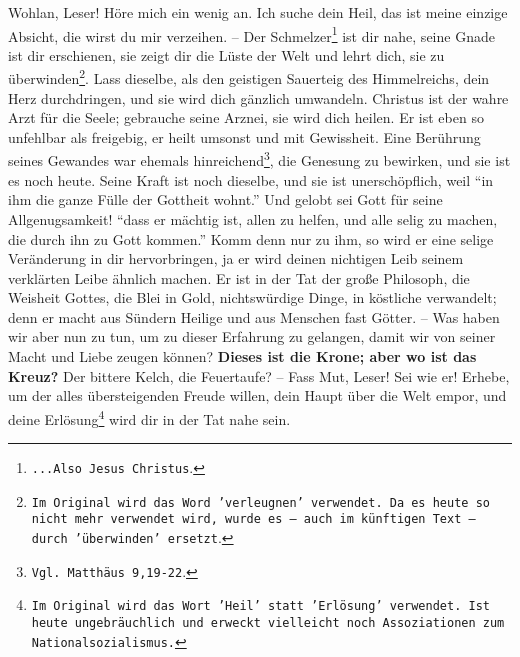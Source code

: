 Wohlan, Leser! Höre mich ein wenig an. Ich suche dein Heil, das ist meine
einzige Absicht, die wirst du mir verzeihen. -- Der
Schmelzer\footnote{\texttt{...Also
Jesus Christus}.} ist dir nahe, seine Gnade ist dir erschienen, sie zeigt dir die
Lüste der Welt und lehrt dich, sie zu überwinden\footnote{\texttt{Im Original
wird das
Word 'verleugnen' verwendet. Da es heute so nicht mehr verwendet wird, wurde
es -- auch im künftigen Text -- durch 'überwinden' ersetzt}.}. Lass dieselbe,
als den geistigen Sauerteig des Himmelreichs, dein Herz durchdringen, und sie
wird dich gänzlich umwandeln. Christus ist der wahre Arzt für die Seele;
gebrauche seine Arznei, sie wird dich heilen. Er ist eben so unfehlbar als
freigebig, er heilt umsonst und mit Gewissheit. Eine Berührung seines Gewandes
war ehemals hinreichend\footnote{\texttt{Vgl. Matthäus 9,19-22}.}, die Genesung
zu
bewirken, und sie ist es noch heute. Seine Kraft ist noch dieselbe, und sie ist
unerschöpflich, weil "`in ihm die ganze Fülle der Gottheit wohnt."' Und gelobt
sei Gott für seine Allgenugsamkeit! "`dass er mächtig ist, allen zu helfen, und
alle selig zu machen, die durch ihn zu Gott kommen."' Komm denn nur zu ihm, so
wird er eine selige Veränderung in dir hervorbringen, ja er wird deinen
nichtigen Leib seinem verklärten Leibe ähnlich machen. Er ist in der Tat der
große Philosoph, die Weisheit Gottes, die Blei in Gold, nichtswürdige Dinge, in
köstliche verwandelt; denn er macht aus Sündern Heilige und aus Menschen fast
Götter. -- Was haben wir aber nun zu tun, um zu dieser Erfahrung zu gelangen,
damit wir von seiner Macht und Liebe zeugen können? 
 \textbf{Dieses ist die
Krone; aber wo ist das Kreuz?} Der bittere Kelch, die Feuertaufe? -- Fass Mut,
Leser! Sei wie er! Erhebe, um der alles übersteigenden Freude willen, dein Haupt
über die Welt empor, und deine Erlösung\footnote{\texttt{Im Original wird das
Wort
'Heil' statt 'Erlösung' verwendet. Ist heute ungebräuchlich und erweckt
vielleicht noch Assoziationen zum Nationalsozialismus.}} wird dir in der Tat
nahe sein.

\medskip


